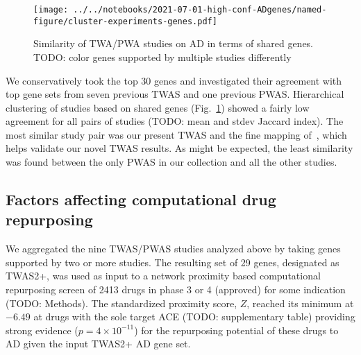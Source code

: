 \documentclass[letterpaper]{article}
\begin{document}
\begin{figure}
\texttt{[image: ../../notebooks/2021-07-01-high-conf-ADgenes/named-figure/cluster-experiments-genes.pdf]}
\caption{
Similarity of TWA/PWA studies on AD in terms of shared genes.
  TODO: color genes supported by multiple studies differently
}
\label{fig:twas-clustermap}
\end{figure}

We conservatively took the top 30 genes and investigated their agreement with
top gene sets from seven previous TWAS and one previous PWAS.  Hierarchical clustering of studies
based on shared genes (Fig.~\ref{fig:twas-clustermap}) showed a fairly low
agreement for all pairs of studies (TODO: mean and stdev Jaccard index).  The
most similar study pair was our present TWAS and the fine mapping
of~\cite{Jansen2019}, which helps validate our novel TWAS results.  As might
be expected, the least similarity was found between the only PWAS in our collection
and all the other studies.

\subsection{Factors affecting computational drug repurposing}

We aggregated the nine TWAS/PWAS studies analyzed above by taking genes
supported by two or more studies.  The resulting set of 29 genes, designated
as TWAS2+, was used as input to a network proximity based computational
repurposing screen of 2413 drugs in phase 3 or 4 (approved) for some
indication (TODO: Methods).  The standardized proximity score, $Z$, reached
its minimum at $-6.49$ at drugs with the sole target ACE (TODO: supplementary
table) providing strong evidence ($p=4\times 10^{-11}$) for the repurposing
potential of these drugs to AD given the input TWAS2+ AD gene set.
\end{document}
